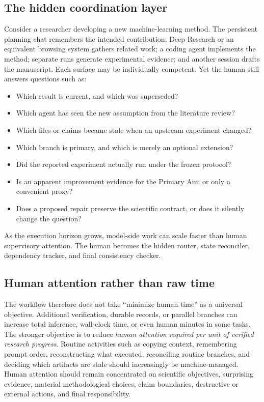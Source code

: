 \documentclass[11pt,a4paper]{article}
\begin{document}
\subsection{The hidden coordination layer}
Consider a researcher developing a new machine-learning method. The persistent planning chat remembers the intended contribution; Deep Research or an equivalent browsing system gathers related work; a coding agent implements the method; separate runs generate experimental evidence; and another session drafts the manuscript. Each surface may be individually competent. Yet the human still answers questions such as:
\begin{itemize}
\item Which result is current, and which was superseded?
\item Which agent has seen the new assumption from the literature review?
\item Which files or claims became stale when an upstream experiment changed?
\item Which branch is primary, and which is merely an optional extension?
\item Did the reported experiment actually run under the frozen protocol?
\item Is an apparent improvement evidence for the Primary Aim or only a convenient proxy?
\item Does a proposed repair preserve the scientific contract, or does it silently change the question?
\end{itemize}
As the execution horizon grows, model-side work can scale faster than human supervisory attention. The human becomes the hidden router, state reconciler, dependency tracker, and final consistency checker.

\subsection{Human attention rather than raw time}
The workflow therefore does not take ``minimize human time'' as a universal objective. Additional verification, durable records, or parallel branches can increase total inference, wall-clock time, or even human minutes in some tasks. The stronger objective is to reduce \emph{human attention required per unit of verified research progress}. Routine activities such as copying context, remembering prompt order, reconstructing what executed, reconciling routine branches, and deciding which artifacts are stale should increasingly be machine-managed. Human attention should remain concentrated on scientific objectives, surprising evidence, material methodological choices, claim boundaries, destructive or external actions, and final responsibility.
\end{document}
